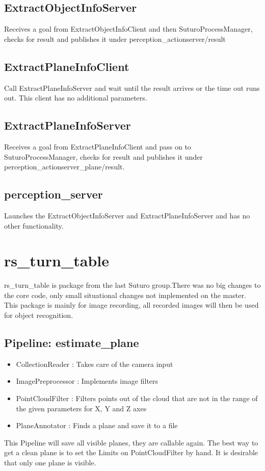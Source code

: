 \documentclass[main.tex]{subfiles}
\begin{document}
			\subsection{ExtractObjectInfoServer}
Receives a goal from ExtractObjectInfoClient and then SuturoProcessManager, checks for result and publishes it under perception\_actionserver/result 

			\subsection{ExtractPlaneInfoClient}
Call ExtractPlaneInfoServer and wait until the result arrives or the time out runs out. This client has no additional parameters.

			\subsection{ExtractPlaneInfoServer}
Receives a goal from ExtractPlaneInfoClient and pass on to SuturoProcessManager, checks for result and publishes it under perception\_actionserver\_plane/result.

			\subsection{perception\_server}
Launches the ExtractObjectInfoServer and ExtractPlaneInfoServer and has no other functionality.

		\section{rs\_turn\_table}
rs\_turn\_table is package from the last Suturo group.There was no big changes to the core code, only small situational changes not implemented on the master. 
This package is mainly for image recording, all recorded images will then be used for object recognition.  
			\subsection{Pipeline: estimate\_plane}
\begin{itemize}
	\item CollectionReader : Takes care of the camera input
	\item ImagePreprocessor : Implements image filters  
	\item PointCloudFilter : Filters points out of the cloud that are not in the range of the given parameters for X, Y and Z axes
	\item PlaneAnnotator : Finds a plane and save it to a file 
\end{itemize}
This Pipeline will save all visible planes, they are callable again. The best way to get a clean plane is to set the Limits on PointCloudFilter by hand. It is desirable that only one plane is visible. 
\end{document}
